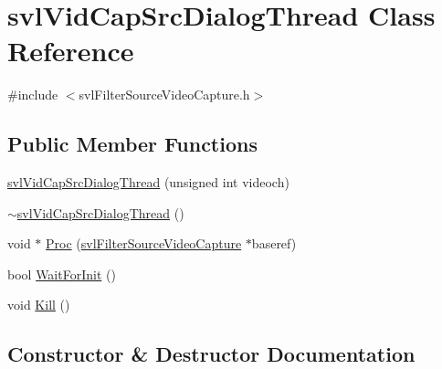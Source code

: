 \hypertarget{classsvl_vid_cap_src_dialog_thread}{}\section{svl\+Vid\+Cap\+Src\+Dialog\+Thread Class Reference}
\label{classsvl_vid_cap_src_dialog_thread}


{\ttfamily \#include $<$svl\+Filter\+Source\+Video\+Capture.\+h$>$}

\subsection*{Public Member Functions}
\begin{DoxyCompactItemize}
\item 
\hyperlink{classsvl_vid_cap_src_dialog_thread_a2940a06273a910dd94dd641cc50d3faa}{svl\+Vid\+Cap\+Src\+Dialog\+Thread} (unsigned int videoch)
\item 
\hyperlink{classsvl_vid_cap_src_dialog_thread_adeafa27987555118632063e55346bf56}{$\sim$svl\+Vid\+Cap\+Src\+Dialog\+Thread} ()
\item 
void $\ast$ \hyperlink{classsvl_vid_cap_src_dialog_thread_a0f74a0e0d1d8bcd7aa6ce4823318236a}{Proc} (\hyperlink{classsvl_filter_source_video_capture}{svl\+Filter\+Source\+Video\+Capture} $\ast$baseref)
\item 
bool \hyperlink{classsvl_vid_cap_src_dialog_thread_a578e3c36e7caf08956688408bb1e65f9}{Wait\+For\+Init} ()
\item 
void \hyperlink{classsvl_vid_cap_src_dialog_thread_adf803dd185f9e23661986bceedb1aac9}{Kill} ()
\end{DoxyCompactItemize}


\subsection{Constructor \& Destructor Documentation}
\hypertarget{classsvl_vid_cap_src_dialog_thread_a2940a06273a910dd94dd641cc50d3faa}{}
